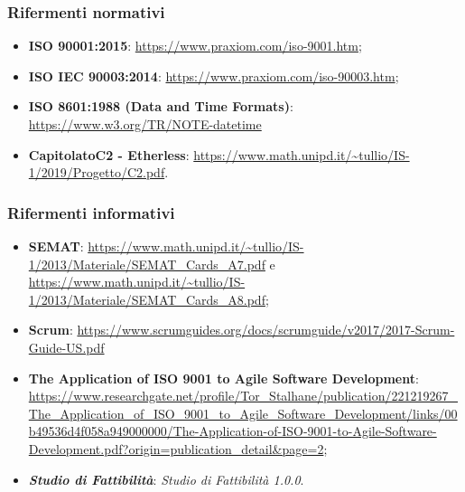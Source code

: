 \subsubsection{Rifermenti normativi}
\begin{itemize}
  \item \textbf{ISO 90001:2015}: \url{https://www.praxiom.com/iso-9001.htm};
  \item \textbf{ISO IEC 90003:2014}:  \url{https://www.praxiom.com/iso-90003.htm};
  \item \textbf{ISO 8601:1988 (Data and Time Formats)}: \url {https://www.w3.org/TR/NOTE-datetime} 
  \item \textbf{Capitolato\glo C2 - Etherless}: \url{https://www.math.unipd.it/~tullio/IS-1/2019/Progetto/C2.pdf}.
\end{itemize}

\subsubsection{Rifermenti informativi}
\begin{itemize}
  \item \textbf{SEMAT}: \url{https://www.math.unipd.it/~tullio/IS-1/2013/Materiale/SEMAT_Cards_A7.pdf} e
  \url{https://www.math.unipd.it/~tullio/IS-1/2013/Materiale/SEMAT_Cards_A8.pdf};
  \item \textbf{Scrum}: \url{https://www.scrumguides.org/docs/scrumguide/v2017/2017-Scrum-Guide-US.pdf}
  \item \textbf{The Application of ISO 9001 to Agile Software Development}: \url{https://www.researchgate.net/profile/Tor_Stalhane/publication/221219267_The_Application_of_ISO_9001_to_Agile_Software_Development/links/00b49536d4f058a949000000/The-Application-of-ISO-9001-to-Agile-Software-Development.pdf?origin=publication_detail&page=2};
  \item \textbf{\textit{Studio di Fattibilità\docs}}: \textit{Studio di Fattibilità 1.0.0}.

\end{itemize}
